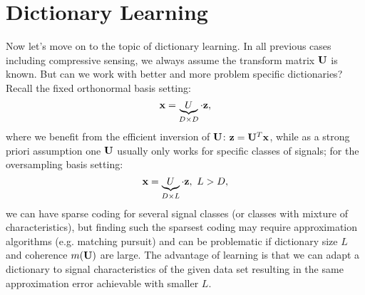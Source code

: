 \documentclass[../book-template.tex]{subfiles}
\begin{document}
\section{Dictionary Learning}
Now let's move on to the topic of dictionary learning. In all previous cases including compressive sensing, we always assume the transform matrix ${\bf U}$ is known. But can we work with better and more problem specific dictionaries? Recall the fixed orthonormal basis setting:
\begin{equation*}
	{\bf x} = \underbrace{U}_{D\times D}\cdot {\bf z},
\end{equation*}
where we benefit from the efficient inversion of ${\bf U}$: ${\bf z} = {\bf U}^T{\bf x}$, while as a strong priori assumption one ${\bf U}$ usually only works for specific classes of signals; for the oversampling basis setting:
\begin{equation*}
{\bf x} = \underbrace{U}_{D\times L}\cdot {\bf z},\ L>D,
\end{equation*}
we can have sparse coding for several signal classes (or classes with mixture of characteristics), but finding such the sparsest coding may require approximation algorithms (e.g. matching pursuit) and can be problematic if dictionary size $L$ and coherence $m(\bf U)$ are large. The advantage of learning is that we can adapt a dictionary to signal characteristics of the given data set resulting in the same approximation error achievable with smaller $L$.
\end{document}

